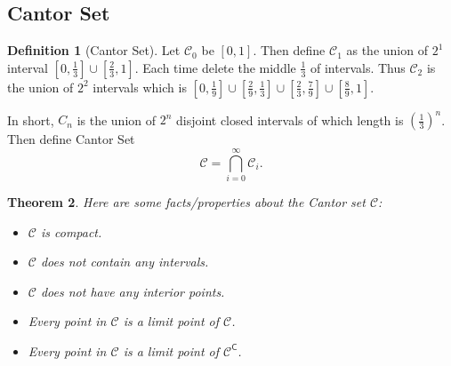 \documentclass[12pt, lettersize]{article}
\theoremstyle{plain}
\newtheorem{thm}{Theorem}[section]
\theoremstyle{definition}
\newtheorem{dfn}[thm]{Definition}
\theoremstyle{remark}
\newcommand{\com}{\mathsf{C}}
\begin{document}
\subsection*{Cantor Set}
\begin{dfn}[Cantor Set]
	Let $\mathcal{C}_0$ be $[0,1]$. Then define $\mathcal{C}_1$ as the union of $2^1$ interval $[0,\frac{1}{3}]\cup[\frac{2}{3},1]$. Each time delete the middle $\frac{1}{3}$ of intervals. Thus $\mathcal{C}_2$ is the union of $2^2$ intervals which is $[0,\frac{1}{9}]\cup[\frac{2}{9},\frac{1}{3}]\cup[\frac{2}{3},\frac{7}{9}]\cup[\frac{8}{9},1]$.\smallskip
	
	In short, $C_n$ is the union of $2^n$ disjoint closed intervals of which length is $(\frac{1}{3})^n$. Then define Cantor Set
	\begin{displaymath}
		\mathcal{C}=\bigcap_{i=0}^{\infty}\mathcal{C}_i.
	\end{displaymath}
\end{dfn}
\begin{thm}
	Here are some facts/properties about the Cantor set $\mathcal{C}$:
	\begin{itemize}
		\item $\mathcal{C}$ is compact.
		\item $\mathcal{C}$ does not contain any intervals.
		\item $\mathcal{C}$ does not have any interior points.
		\item Every point in $\mathcal{C}$ is a limit point of $\mathcal{C}$.
		\item Every point in $\mathcal{C}$ is a limit point of $\mathcal{C}^\com$.
	\end{itemize}
\end{thm}	
\end{document}

